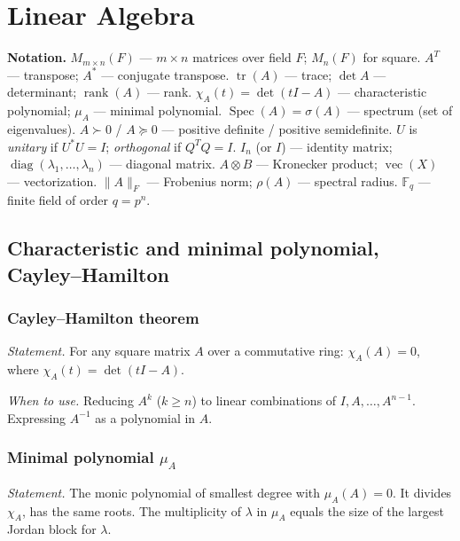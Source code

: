 \chapter{Linear Algebra}
\label{ch:linalg}

\medskip

\textbf{Notation.} $M_{m\times n}(F)$ --- $m\times n$ matrices over field $F$; $M_n(F)$ for square.
$A^T$ --- transpose; $A^*$ --- conjugate transpose.
$\operatorname{tr}(A)$ --- trace; $\det A$ --- determinant; $\operatorname{rank}(A)$ --- rank.
$\chi_A(t)=\det(tI-A)$ --- characteristic polynomial; $\mu_A$ --- minimal polynomial.
$\operatorname{Spec}(A)=\sigma(A)$ --- spectrum (set of eigenvalues).
$A\succ0$ / $A\succeq0$ --- positive definite / positive semidefinite.
$U$ is \textit{unitary} if $U^*U=I$; \textit{orthogonal} if $Q^TQ=I$.
$I_n$ (or $I$) --- identity matrix; $\operatorname{diag}(\lambda_1,\dots,\lambda_n)$ --- diagonal matrix.
$A\otimes B$ --- Kronecker product; $\operatorname{vec}(X)$ --- vectorization.
$\|A\|_F$ --- Frobenius norm; $\rho(A)$ --- spectral radius.
$\mathbb{F}_q$ --- finite field of order $q=p^n$.

\medskip

\section{Characteristic and minimal polynomial, Cayley--Hamilton}
\label{sec:cayley-hamilton}

\subsection{Cayley--Hamilton theorem}
\label{subsec:cayley-hamilton}

\textit{Statement.} For any square matrix $A$ over a commutative ring: $\chi_A(A)=0$, where $\chi_A(t)=\det(tI-A)$.

\textit{When to use.} Reducing $A^k$ ($k\ge n$) to linear combinations of $I,A,\dots,A^{n-1}$. Expressing $A^{-1}$ as a polynomial in $A$.

\subsection{Minimal polynomial $\mu_A$}
\label{subsec:minimal-polynomial}

\textit{Statement.} The monic polynomial of smallest degree with $\mu_A(A)=0$. It divides $\chi_A$, has the same roots. The multiplicity of $\lambda$ in $\mu_A$ equals the size of the largest Jordan block for $\lambda$.

